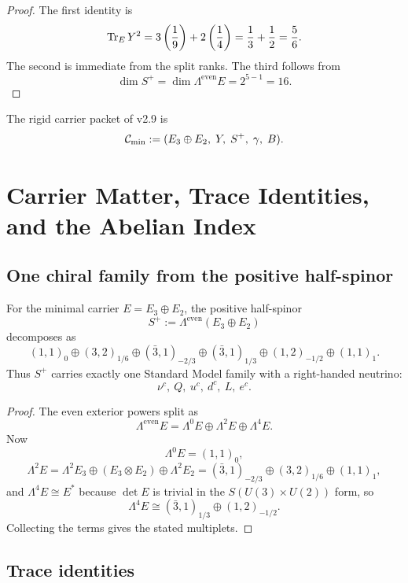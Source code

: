 \begin{proof}
The first identity is
\[
\operatorname{Tr}_EY^2 = 3\left(\frac19\right)+2\left(\frac14\right)=\frac13+\frac12=\frac56.
\]
The second is immediate from the split ranks. The third follows from
\[
\dim S^+ = \dim \Lambda^{\mathrm{even}}E = 2^{5-1}=16.
\]
\end{proof}

\begin{definition}
The rigid carrier packet of v2.9 is
\[
\mathcal C_{\min} := (E_3\oplus E_2,\;Y,\;S^+,\;\gamma,\;B).
\]
\end{definition}

\section{Carrier Matter, Trace Identities, and the Abelian Index}

\subsection{One chiral family from the positive half-spinor}

\begin{theorem}
For the minimal carrier $E=E_3\oplus E_2$, the positive half-spinor
\[
S^+ := \Lambda^{\mathrm{even}}(E_3\oplus E_2)
\]
decomposes as
\[
(1,1)_0
\oplus
(3,2)_{1/6}
\oplus
(\bar 3,1)_{-2/3}
\oplus
(\bar 3,1)_{1/3}
\oplus
(1,2)_{-1/2}
\oplus
(1,1)_1.
\]
Thus $S^+$ carries exactly one Standard Model family with a right-handed neutrino:
\[
\nu^c,\ Q,\ u^c,\ d^c,\ L,\ e^c.
\]
\end{theorem}

\begin{proof}
The even exterior powers split as
\[
\Lambda^{\mathrm{even}}E
=
\Lambda^0 E \oplus \Lambda^2 E \oplus \Lambda^4 E.
\]
Now
\[
\Lambda^0 E = (1,1)_0,
\]
\[
\Lambda^2 E = \Lambda^2 E_3 \oplus (E_3\otimes E_2)\oplus \Lambda^2 E_2
= (\bar 3,1)_{-2/3}\oplus (3,2)_{1/6}\oplus (1,1)_1,
\]
and $\Lambda^4E \cong E^\ast$ because $\det E$ is trivial in the $S(U(3)\times U(2))$ form, so
\[
\Lambda^4E \cong (\bar 3,1)_{1/3}\oplus (1,2)_{-1/2}.
\]
Collecting the terms gives the stated multiplets.
\end{proof}

\subsection{Trace identities}

